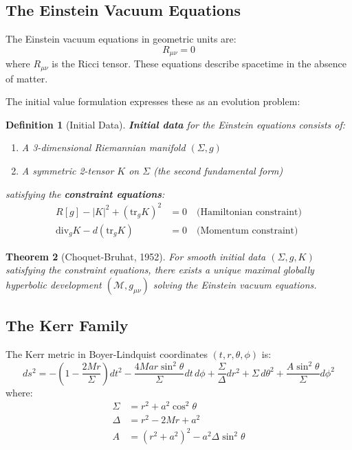 \documentclass[12pt,a4paper]{article}
\newtheorem{theorem}{Theorem}[section]
\newtheorem{definition}[theorem]{Definition}
\newcommand{\M}{\mathcal{M}}
\begin{document}
\subsection{The Einstein Vacuum Equations}

The Einstein vacuum equations in geometric units are:
\begin{equation}
R_{\mu\nu} = 0
\end{equation}
where $R_{\mu\nu}$ is the Ricci tensor. These equations describe spacetime in the absence of matter.

The initial value formulation expresses these as an evolution problem:

\begin{definition}[Initial Data]
\textbf{Initial data} for the Einstein equations consists of:
\begin{enumerate}
    \item A 3-dimensional Riemannian manifold $(\Sigma, g)$
    \item A symmetric 2-tensor $K$ on $\Sigma$ (the second fundamental form)
\end{enumerate}
satisfying the \textbf{constraint equations}:
\begin{align}
R[g] - |K|^2 + (\text{tr}_g K)^2 &= 0 \quad \text{(Hamiltonian constraint)} \\
\text{div}_g K - d(\text{tr}_g K) &= 0 \quad \text{(Momentum constraint)}
\end{align}
\end{definition}

\begin{theorem}[Choquet-Bruhat, 1952]
For smooth initial data $(\Sigma, g, K)$ satisfying the constraint equations, there exists a unique maximal globally hyperbolic development $(\M, g_{\mu\nu})$ solving the Einstein vacuum equations.
\end{theorem}

\subsection{The Kerr Family}

The Kerr metric in Boyer-Lindquist coordinates $(t, r, \theta, \phi)$ is:
\begin{equation}
ds^2 = -\left(1 - \frac{2Mr}{\Sigma}\right)dt^2 - \frac{4Mar\sin^2\theta}{\Sigma}dt\,d\phi + \frac{\Sigma}{\Delta}dr^2 + \Sigma\, d\theta^2 + \frac{A\sin^2\theta}{\Sigma}d\phi^2
\end{equation}
where:
\begin{align}
\Sigma &= r^2 + a^2\cos^2\theta \\
\Delta &= r^2 - 2Mr + a^2 \\
A &= (r^2 + a^2)^2 - a^2\Delta\sin^2\theta
\end{align}
\end{document}
